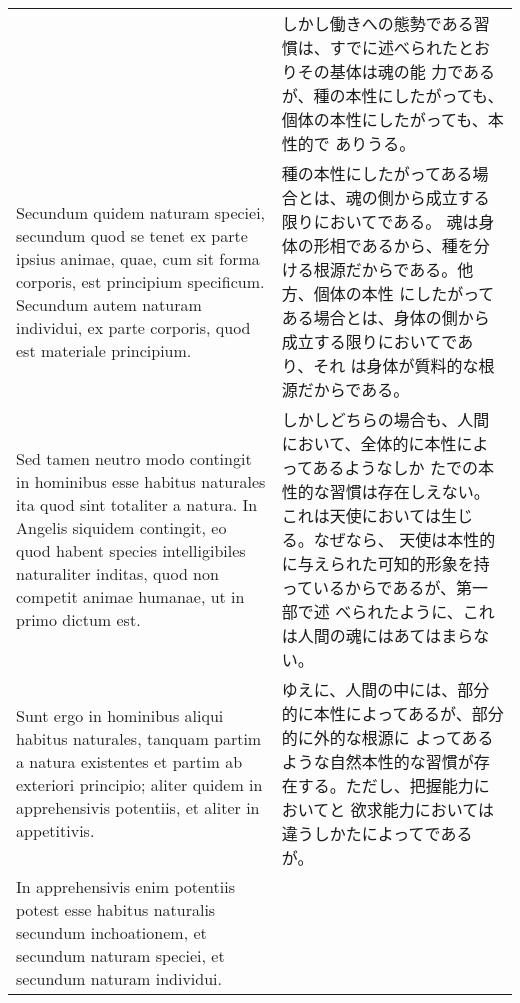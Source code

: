 \documentclass[10pt]{jsarticle} %
\begin{document}
\begin{longtable}{p{21em}p{21em}}
&

しかし働きへの態勢である習慣は、すでに述べられたとおりその基体は魂の能
力であるが、種の本性にしたがっても、個体の本性にしたがっても、本性的で
ありうる。

\\



Secundum quidem naturam speciei, secundum quod se tenet ex parte
ipsius animae, quae, cum sit forma corporis, est principium
specificum. Secundum autem naturam individui, ex parte corporis, quod
est materiale principium.


&

種の本性にしたがってある場合とは、魂の側から成立する限りにおいてである。
魂は身体の形相であるから、種を分ける根源だからである。他方、個体の本性
にしたがってある場合とは、身体の側から成立する限りにおいてであり、それ
は身体が質料的な根源だからである。

\\




Sed tamen neutro modo contingit in hominibus esse habitus naturales
ita quod sint totaliter a natura. In Angelis siquidem contingit, eo
quod habent species intelligibiles naturaliter inditas, quod non
competit animae humanae, ut in primo dictum est.


&

しかしどちらの場合も、人間において、全体的に本性によってあるようなしか
たでの本性的な習慣は存在しえない。これは天使においては生じる。なぜなら、
天使は本性的に与えられた可知的形象を持っているからであるが、第一部で述
べられたように、これは人間の魂にはあてはまらない。

\\



Sunt ergo in hominibus aliqui habitus naturales, tanquam partim a
natura existentes et partim ab exteriori principio; aliter quidem in
apprehensivis potentiis, et aliter in appetitivis.

&

ゆえに、人間の中には、部分的に本性によってあるが、部分的に外的な根源に
よってあるような自然本性的な習慣が存在する。ただし、把握能力においてと
欲求能力においては違うしかたによってであるが。

\\



In apprehensivis enim potentiis potest esse habitus naturalis secundum
inchoationem, et secundum naturam speciei, et secundum naturam
individui.



\end{longtable}
\end{document}
